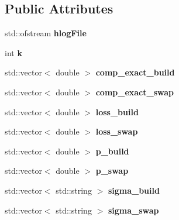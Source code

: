 \subsection*{Public Attributes}
\begin{DoxyCompactItemize}
\item 
\mbox{\label{structLogHelper_a084e11845451a653f46a48ab92c97ee8}} 
std\+::ofstream {\bfseries hlog\+File}
\item 
\mbox{\label{structLogHelper_ac606e3c78f973cb42f55ea6f8a11e509}} 
int {\bfseries k}
\item 
\mbox{\label{structLogHelper_a7f9490e07d6bfc71b0d0fd555ca4f530}} 
std\+::vector$<$ double $>$ {\bfseries comp\+\_\+exact\+\_\+build}
\item 
\mbox{\label{structLogHelper_aaee1d830760c6b497f2fad31a0e368f8}} 
std\+::vector$<$ double $>$ {\bfseries comp\+\_\+exact\+\_\+swap}
\item 
\mbox{\label{structLogHelper_a8da7e85d166977478fcfe848bb739dfa}} 
std\+::vector$<$ double $>$ {\bfseries loss\+\_\+build}
\item 
\mbox{\label{structLogHelper_a3361ae9284a7fca5b867165e0380af4b}} 
std\+::vector$<$ double $>$ {\bfseries loss\+\_\+swap}
\item 
\mbox{\label{structLogHelper_aed75dac28380b3f67b777d6b36719aa9}} 
std\+::vector$<$ double $>$ {\bfseries p\+\_\+build}
\item 
\mbox{\label{structLogHelper_a87a35e651ad2a32092777e1d9bd4acfa}} 
std\+::vector$<$ double $>$ {\bfseries p\+\_\+swap}
\item 
\mbox{\label{structLogHelper_a835a54928567970dd564d9eaed87597c}} 
std\+::vector$<$ std\+::string $>$ {\bfseries sigma\+\_\+build}
\item 
\mbox{\label{structLogHelper_afee211952d9a61c217622557e91c1275}} 
std\+::vector$<$ std\+::string $>$ {\bfseries sigma\+\_\+swap}
\end{DoxyCompactItemize}



